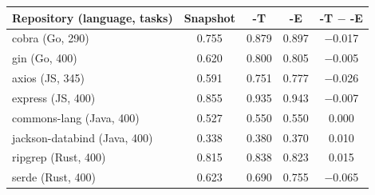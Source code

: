 \begin{tabular}{lcccc}
\toprule
Repository (language, tasks) & Snapshot & \sys{}-T & \sys{}-E & \sys{}-T $-$ \sys{}-E \\
\midrule
cobra (Go, 290) & 0.755 & 0.879 & 0.897 & $-$0.017 \\
gin (Go, 400) & 0.620 & 0.800 & 0.805 & $-$0.005 \\
axios (JS, 345) & 0.591 & 0.751 & 0.777 & $-$0.026 \\
express (JS, 400) & 0.855 & 0.935 & 0.943 & $-$0.007 \\
commons-lang (Java, 400) & 0.527 & 0.550 & 0.550 & 0.000 \\
jackson-databind (Java, 400) & 0.338 & 0.380 & 0.370 & 0.010 \\
ripgrep (Rust, 400) & 0.815 & 0.838 & 0.823 & 0.015 \\
serde (Rust, 400) & 0.623 & 0.690 & 0.755 & $-$0.065 \\
\bottomrule
\end{tabular}